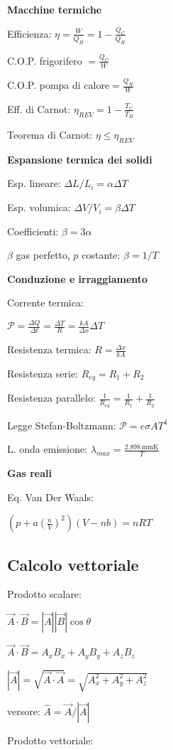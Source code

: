 \documentclass[10pt]{article}
\begin{document}
\begin{multicols}{3}
\textbf{Macchine termiche}

Efficienza: $\eta = \frac{W}{Q_H} = 1 - \frac{Q_C}{Q_H}$

C.O.P. frigorifero $ = \frac{Q_C}{W}$

C.O.P. pompa di calore$ = \frac{Q_H}{W}$

Eff.  di Carnot: $\eta_{REV} = 1 - \frac{T_C}{T_H}$

Teorema di Carnot: $\eta \leq \eta_{REV}$ 


\textbf{Espansione termica dei solidi}

Esp. lineare: $\Delta L / L_i = \alpha \Delta T$

Esp. volumica: $\Delta V / V_i = \beta \Delta T$

Coefficienti: $\beta = 3 \alpha$

$\beta$ gas perfetto, $p$ costante: $\beta = 1/T$

\textbf{Conduzione e irraggiamento}

Corrente termica: 

$\mathcal{P} = \frac{\Delta Q}{\Delta t} = \frac{\Delta T}{R} = \frac{kA}{\Delta x}\Delta T$ 

Resistenza termica: $R = \frac{\Delta x}{k A}$

Resistenza serie: $R_{eq} = R_1 + R_2$

Resistenza parallelo: $\frac{1}{R_{eq}} = \frac{1}{R_1} + \frac{1}{R_2}$

Legge Stefan-Boltzmann: $\mathcal{P} = e \sigma A T^{4}$

L. onda emissione: $\lambda_{max} = \frac{2.898 \,\mathrm{mm K}}{T}$

\textbf{Gas reali}

Eq. Van Der Waals:

 $(p + a (\frac{n}{V})^{2})(V - nb) = nRT$

\subsection*{Calcolo vettoriale}

Prodotto scalare: 

$\vec A \cdot \vec B = | \vec A || \vec B |\cos\theta $

$\vec A \cdot \vec B = A_xB_x + A_yB_y + A_zB_z$

$|\vec A| = \sqrt{\vec A \cdot \vec A} = \sqrt{A_x^2 + A_y^2 + A_z^2}$

versore: $\hat A =  {\vec A} /  {|\vec A|}$

Prodotto vettoriale:


\end{multicols}
\end{document}
